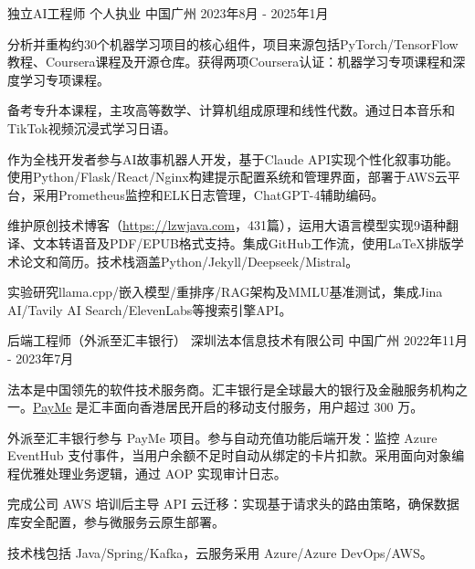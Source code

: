 \begin{cventries}
  \cventry
    {独立AI工程师} %
    {个人执业} %
    {中国广州} %
    {2023年8月 - 2025年1月} %
    {
      \begin{cvitems} %
        \item {分析并重构约30个机器学习项目的核心组件，项目来源包括PyTorch/TensorFlow教程、Coursera课程及开源仓库。获得两项Coursera认证：机器学习专项课程和深度学习专项课程。}
        \item {备考专升本课程，主攻高等数学、计算机组成原理和线性代数。通过日本音乐和TikTok视频沉浸式学习日语。}
        \item {作为全栈开发者参与AI故事机器人开发，基于Claude API实现个性化叙事功能。使用Python/Flask/React/Nginx构建提示配置系统和管理界面，部署于AWS云平台，采用Prometheus监控和ELK日志管理，ChatGPT-4辅助编码。}
        \item {维护原创技术博客（\url{https://lzwjava.com}，431篇），运用大语言模型实现9语种翻译、文本转语音及PDF/EPUB格式支持。集成GitHub工作流，使用LaTeX排版学术论文和简历。技术栈涵盖Python/Jekyll/Deepseek/Mistral。}
        \item {实验研究llama.cpp/嵌入模型/重排序/RAG架构及MMLU基准测试，集成Jina AI/Tavily AI Search/ElevenLabs等搜索引擎API。}
      \end{cvitems}
    }
  \cventry
    {后端工程师（外派至汇丰银行）} %
    {深圳法本信息技术有限公司} %
    {中国广州} %
    {2022年11月 - 2023年7月} %
    {
      \begin{cvitems} %
        \item {法本是中国领先的软件技术服务商。汇丰银行是全球最大的银行及金融服务机构之一。\href{https://payme.hsbc.com.hk/}{PayMe} 是汇丰面向香港居民开启的移动支付服务，用户超过 300 万。}
        \item {外派至汇丰银行参与 PayMe 项目。参与自动充值功能后端开发：监控 Azure EventHub 支付事件，当用户余额不足时自动从绑定的卡片扣款。采用面向对象编程优雅处理业务逻辑，通过 AOP 实现审计日志。}
        \item {完成公司 AWS 培训后主导 API 云迁移：实现基于请求头的路由策略，确保数据库安全配置，参与微服务云原生部署。}
        \item {技术栈包括 Java/Spring/Kafka，云服务采用 Azure/Azure DevOps/AWS。}
      \end{cvitems}
    }


\end{cventries}
